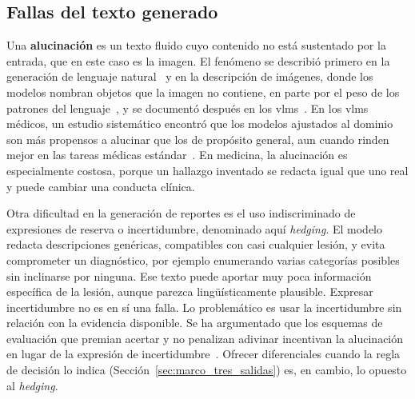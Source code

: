 \subsection{Fallas del texto generado}
\label{sec:marco_rep_fallas}

Una \textbf{alucinación} es un texto fluido cuyo contenido no está sustentado por la entrada, que en este caso
es la imagen. El fenómeno se describió primero en la generación de lenguaje natural~\cite{ji2023survey} y en la
descripción de imágenes, donde los modelos nombran objetos que la imagen no contiene, en parte por el peso de
los patrones del lenguaje~\cite{rohrbach2018object}, y se documentó después en los
\glspl{vlm}~\cite{bai2024hallucination}. En los \glspl{vlm} médicos, un estudio sistemático encontró que los
modelos ajustados al dominio son más propensos a alucinar que los de propósito general, aun cuando rinden
mejor en las tareas médicas estándar~\cite{gu2024medvh}. En medicina, la alucinación es especialmente costosa,
porque un hallazgo inventado se redacta igual que uno real y puede cambiar una conducta clínica.

Otra dificultad en la generación de reportes es el uso indiscriminado de expresiones de reserva o incertidumbre, denominado aquí \emph{hedging}. El modelo redacta descripciones genéricas, compatibles con
casi cualquier lesión, y evita comprometer un diagnóstico, por ejemplo enumerando varias categorías posibles
sin inclinarse por ninguna. Ese texto puede aportar muy poca información específica de la lesión, aunque parezca lingüísticamente plausible. Expresar incertidumbre no es en sí una falla. Lo problemático es usar la incertidumbre sin relación con la evidencia disponible. Se ha argumentado que los esquemas de
evaluación que premian acertar y no penalizan adivinar incentivan la alucinación en lugar de la expresión de
incertidumbre~\cite{kalai2025hallucinate}. Ofrecer diferenciales cuando la regla de decisión lo indica
(Sección~\ref{sec:marco_tres_salidas}) es, en cambio, lo opuesto al \emph{hedging}.

